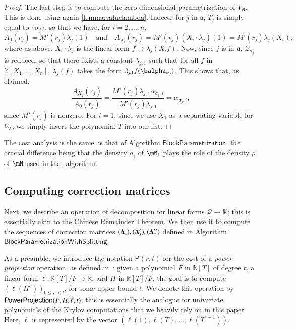 \documentclass[final,1p,times,authoryear]{elsarticle}
\newcommand{\mat}[1]{\bm{\MakeUppercase{#1}}} %
\newcommand{\mainalgoname}{\mathsf{ BlockParametrization}}
\newcommand{\residueI}{\mathscr{Q}}
\def\PP {\ensuremath{\mathsf{P}}}
\def\K{\mathbb{K}}
\def\K {\ensuremath{\mathbb{K}}}
\def\Kbar {{\ensuremath{\overline{\mathbb{K}}}}}
\begin{document}
\begin{proof}
  The last step is to compute the zero-dimensional parametrization of
  $V_{\mathfrak{A}}$. This is done using again
  \cref{lemma:valuelambda}. Indeed, for $j$ in $\mathfrak{a}$, 
  $T_j$ is simply equal to $\{\sigma_j\}$, so that we have, for $i=2,\dots,n$,
  $$ A_0(r_j)=M'(r_j) \lambda_j(1) \quad\text{and}\quad 
  A_{X_i}(r_j) = M'(r_j) (X_i \cdot \lambda_j)(1) = M'(r_j) \lambda_j(X_i),$$
  where as above, $X_i \cdot \lambda_j$ is the linear form $f \mapsto \lambda_j(X_i f)$.
  Now, since $j$
  is in $\mathfrak{a}$, $\residueI_{\sigma_j}$ is reduced, so that there
  exists a constant $\lambda_{j,1}$ such that for all $f$ in
  $\Kbar[X_1,\dots,X_n]$, $\lambda_j(f)$ takes the form $\lambda_{j,1}
  f(\balpha_{\sigma_j})$. This shows that, as claimed,
  $$\frac{ A_{X_j}(r_j)}{ A_0 (r_j)} = 
  \frac
  {M'(r_j) \lambda_{j,1} \alpha_{\sigma_j,i}}{M'(r_j) \lambda_{j,1}} = \alpha_{\sigma_j,i},$$
  since $M'(r_j)$ is nonzero.
  For $i=1$, since we use $X_1$ as a separating variable for $V_{\mathfrak{A}}$, 
  we simply insert the polynomial $T$ into our list.
\end{proof}

The cost analysis is the same as that of Algorithm $\mainalgoname$, the
crucial difference being that the density $\rho_1$ of $\mM_1$ plays the 
role of the density $\rho$ of $\mM$ used in that algorithm.


\subsection{Computing correction matrices}

Next, we describe an operation of decomposition for linear forms
$\residueI \to \K$; this is essentially akin to the Chinese Remainder
Theorem. We then use it to compute the sequences of correction
matrices $(\mat{\Delta}_s),(\mat{\Delta}'_s),(\mat{\Delta}''_s)$
defined in Algorithm $\mathsf{BlockParametrizationWithSplitting}$.

As a preamble, we introduce the notation $\PP(r,t)$ for the cost of a
{\em power projection} operation, as defined
in~\citep{Shoup94,Shoup99}: given a polynomial $F$ in $\K[T]$ of degree
$r$, a linear form $\ell: \K[T]/F \to \K$, and $H$ in $\K[T]/F$, the
goal is to compute $(\ell(H^s))_{0 \le s < t}$, for some upper bound
$t$. We denote this operation by ${\sf PowerProjection}(F,H,\ell,t)$; this is
essentially the analogue for univariate polynomials of the Krylov
computations that we heavily rely on in this paper. Here, $\ell$ 
is represented by the vector $(\ell(1),\ell(T),\dots,\ell(T^{r-1}))$.
\end{document}
